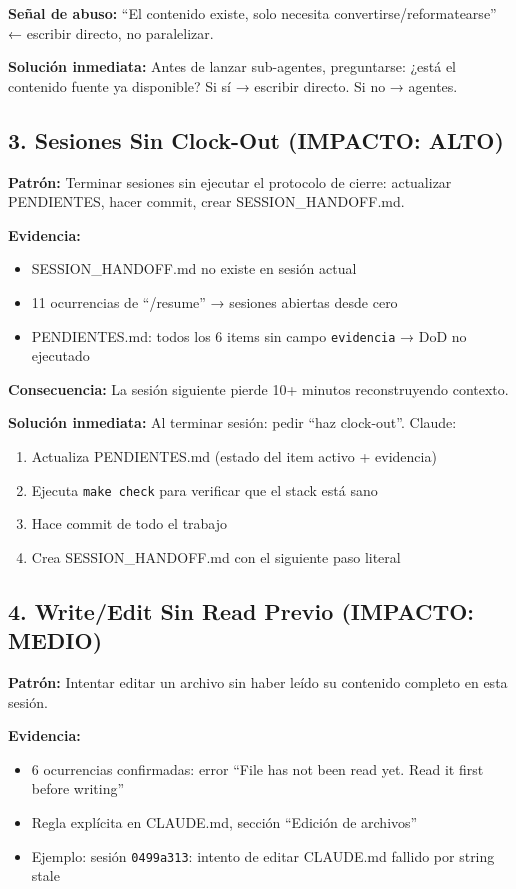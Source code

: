 \documentclass[12pt,a4paper,spanish]{article}
\begin{document}
\textbf{Señal de abuso:} ``El contenido existe, solo necesita convertirse/reformatearse'' ← escribir directo, no paralelizar.

\textbf{Solución inmediata:}
Antes de lanzar sub-agentes, preguntarse: ¿está el contenido fuente ya disponible? Si sí → escribir directo. Si no → agentes.

\subsection{3. Sesiones Sin Clock-Out (IMPACTO: ALTO)}

\textbf{Patrón:} Terminar sesiones sin ejecutar el protocolo de cierre: actualizar PENDIENTES, hacer commit, crear SESSION\_HANDOFF.md.

\textbf{Evidencia:}
\begin{itemize}
  \item SESSION\_HANDOFF.md no existe en sesión actual
  \item 11 ocurrencias de ``/resume'' → sesiones abiertas desde cero
  \item PENDIENTES.md: todos los 6 items sin campo \texttt{evidencia} → DoD no ejecutado
\end{itemize}

\textbf{Consecuencia:} La sesión siguiente pierde 10+ minutos reconstruyendo contexto.

\textbf{Solución inmediata:}
Al terminar sesión: pedir ``haz clock-out''. Claude:
\begin{enumerate}
  \item Actualiza PENDIENTES.md (estado del item activo + evidencia)
  \item Ejecuta \texttt{make check} para verificar que el stack está sano
  \item Hace commit de todo el trabajo
  \item Crea SESSION\_HANDOFF.md con el siguiente paso literal
\end{enumerate}

\subsection{4. Write/Edit Sin Read Previo (IMPACTO: MEDIO)}

\textbf{Patrón:} Intentar editar un archivo sin haber leído su contenido completo en esta sesión.

\textbf{Evidencia:}
\begin{itemize}
  \item 6 ocurrencias confirmadas: error ``File has not been read yet. Read it first before writing''
  \item Regla explícita en CLAUDE.md, sección ``Edición de archivos''
  \item Ejemplo: sesión \texttt{0499a313}: intento de editar CLAUDE.md fallido por string stale
\end{itemize}
\end{document}
